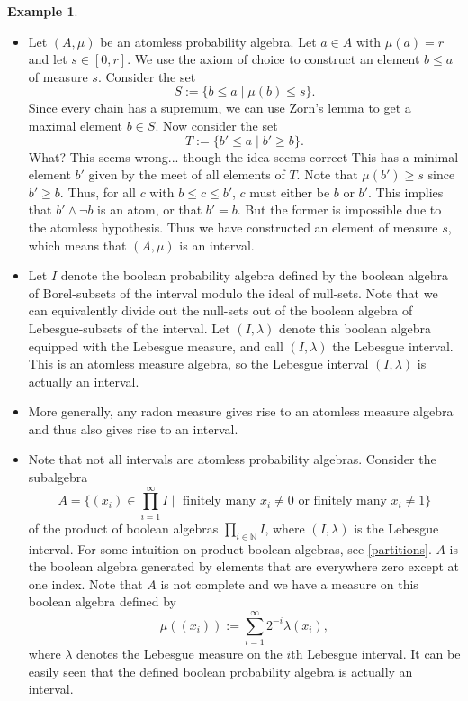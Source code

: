 \documentclass[a4paper]{amsproc}
\theoremstyle{plain}
\theoremstyle{definition}
\newtheorem{example}[theorem]{Example}
\theoremstyle{remark}
\numberwithin{equation}{section}
\begin{document}
\begin{example} \label{interval_examples}
\begin{itemize}
\item Let $(A,\mu)$ be an atomless probability algebra. Let $a \in A$ with $\mu(a) = r$ and let $s \in [0,r]$. We use the axiom of choice to construct an element $b
\leq a$ of measure $s$. Consider the set
\[
S := \{ b \leq a \mid \mu(b) \leq s \}.
\]
Since every chain has a supremum, we can use Zorn's lemma to get a maximal element $b \in S$. Now consider the set
\[
T := \{ b' \leq a \mid b' \geq b\} .
\]
What? This seems wrong... though the idea seems correct
This has a minimal element $b'$ given by the meet of all elements of $T$. Note that $\mu(b') \geq s$ since $b' \geq b$. Thus, for all $c$ with $b \leq c \leq b'$, $c$ must either be $b$ or $b'$. This implies that $b' \wedge \neg b$ is an atom, or that $b' = b$. But the former is impossible due to the atomless hypothesis. Thus we have constructed an element of measure $s$, which means that $(A,\mu)$ is an interval.
\item Let $I$ denote the boolean probability algebra defined by the boolean algebra of Borel-subsets of the interval modulo the ideal of null-sets. Note that we can equivalently divide out the null-sets out of the boolean algebra of Lebesgue-subsets of the interval. Let $(I, \lambda)$ denote this boolean algebra equipped with the Lebesgue measure, and call $(I, \lambda)$ the Lebesgue interval. This is an atomless measure algebra, so the Lebesgue interval $(I, \lambda)$ is actually an interval.
\item More generally, any radon measure gives rise to an atomless measure algebra and thus also gives rise to an interval.
\item Note that not all intervals are atomless probability algebras. Consider the subalgebra
\[
A = \{(x_i) \in \prod_{i=1}^{\infty} I \mid \text{ finitely many } x_i \neq 0 \text{ or finitely many } x_i \neq 1 \}
\]
of the product of boolean algebras $\prod_{i \in \mathbb{N}} I$, where $(I, \lambda)$ is the Lebesgue interval. For some intuition on product boolean algebras, see \ref{partitions}. $A$ is the boolean algebra generated by elements that are everywhere zero except at one index. Note that $A$ is not complete and we have a measure on this boolean algebra defined by
\[
\mu((x_i)) := \sum_{i=1}^{\infty} 2^{-i} \lambda(x_i) ,
\]
where $\lambda$ denotes the Lebesgue measure on the $i$th Lebesgue interval. It can be easily seen that the defined boolean probability algebra is actually an interval.
\end{itemize}
\end{example}
\end{document}
